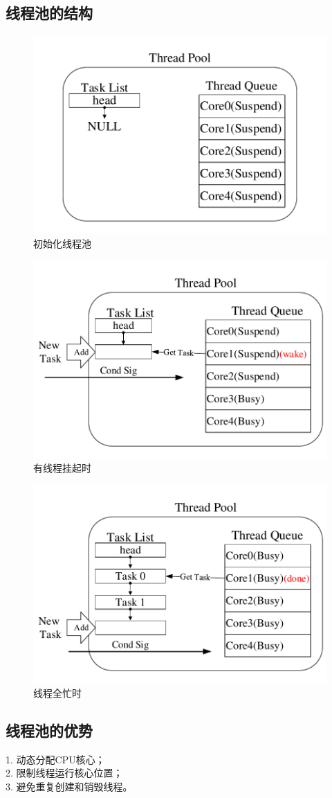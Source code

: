 \documentclass{article}
\begin{document}
\subsection{线程池的结构}
\begin{figure}[H]
	\centering
	\includegraphics[width = .6\textwidth]{init.pdf}
	\caption{初始化线程池}
\end{figure}
\begin{figure}[H]
	\centering
	\includegraphics[width = .6\textwidth]{suspend.pdf}
	\caption{有线程挂起时}
\end{figure}
\begin{figure}[H]
	\centering
	\includegraphics[width = .6\textwidth]{busy.pdf}
	\caption{线程全忙时}
\end{figure}
\subsection{线程池的优势}
1. 动态分配CPU核心；\\
2. 限制线程运行核心位置；\\
3. 避免重复创建和销毁线程。
\end{document}
